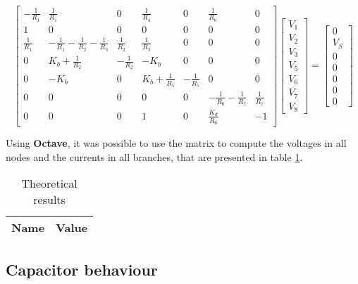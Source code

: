 \begin{equation}
  \begin{bmatrix}
    -\frac{1}{R_1} & \frac{1}{R_1} & 0 & \frac{1}{R_4} & 0 & \frac{1}{R_6} & 0 \\
    1 & 0 & 0 & 0 & 0 & 0 & 0 \\
    \frac{1}{R_1} & -\frac{1}{R_1}-\frac{1}{R_2}-\frac{1}{R_3} & \frac{1}{R_2} & \frac{1}{R_3} & 0 & 0 & 0 \\
    0 & K_b + \frac{1}{R_2} & -\frac{1}{R_2} & -K_b & 0 & 0 & 0 \\
    0 & -K_b & 0 & K_b+\frac{1}{R_5} & -\frac{1}{R_5} & 0 & 0 \\
    0 & 0 & 0 & 0 & 0 & -\frac{1}{R_6}-\frac{1}{R_7} & \frac{1}{R_7} \\
    0 & 0 & 0 & 1 & 0 & \frac{K_d}{R_6} & -1     
  \end{bmatrix}
  \begin{bmatrix}
    V_1 \\
    V_2 \\
    V_3 \\
    V_5 \\
    V_6 \\
    V_7 \\
    V_8
  \end{bmatrix}
  =
  \begin{bmatrix}
    0 \\
    V_S \\
    0 \\
    0 \\
    0 \\
    0 \\
    0
  \end{bmatrix}
\end{equation}

Using {\bf Octave}, it was possible to use the matrix to compute the voltages in all nodes and the currents in all branches, that are presented in table \ref{node_res}. 

\begin{table}[H]
  \centering
  \begin{tabular}{|c|c|}
    \hline
        {\bf Name} & {\bf Value} \\
        \hline
        \hline
        
        \hline
  \end{tabular}
  \caption{Theoretical results}
  \label{node_res}
\end{table}

\subsection{Capacitor behaviour}
\label{sec:Req}


